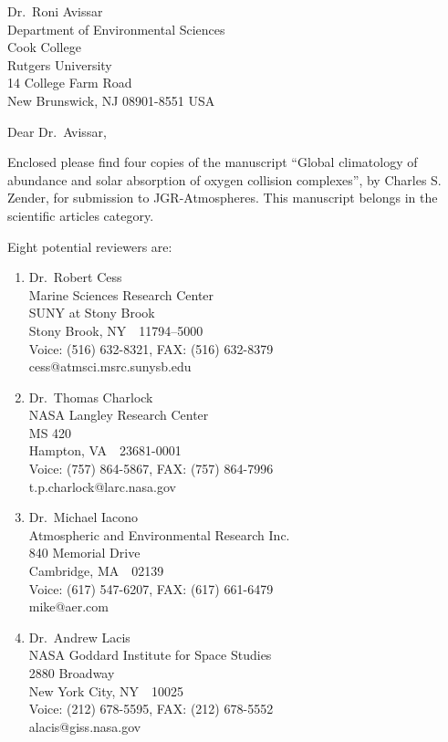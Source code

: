 \documentclass[12pt,twoside]{ncarletter}
\date{January~14, 1999} %
\begin{document}
\begin{letter}{%
Dr.~Roni Avissar\\
Department of Environmental Sciences\\
Cook College\\
Rutgers University\\
14 College Farm Road\\
New Brunswick, NJ 08901-8551 USA}

\opening{Dear Dr.~Avissar,}
\enlargethispage*{0.25in} 

Enclosed please find four copies of the manuscript ``Global
climatology of abundance and solar absorption of oxygen collision
complexes'', by Charles S. Zender, for submission to JGR-Atmospheres.   
This manuscript belongs in the scientific articles category. 

Eight potential reviewers are:
\begin{enumerate}
\item Dr.~Robert Cess\\
Marine Sciences Research Center\\
SUNY at Stony Brook\\
Stony Brook, NY~~11794--5000\\
Voice: (516) 632-8321, FAX: (516) 632-8379\\
cess@atmsci.msrc.sunysb.edu
\item Dr.~Thomas Charlock\\
NASA Langley Research Center\\
MS 420\\
Hampton, VA~~23681-0001\\
Voice: (757) 864-5867, FAX: (757) 864-7996\\
t.p.charlock@larc.nasa.gov
\item Dr.~Michael Iacono\\
Atmospheric and Environmental Research Inc.\\
840 Memorial Drive\\
Cambridge, MA~~02139\\
Voice: (617) 547-6207, FAX: (617) 661-6479\\
mike@aer.com
\item Dr.~Andrew Lacis\\
NASA Goddard Institute for Space Studies\\
2880 Broadway\\
New York City, NY~~10025\\
Voice: (212) 678-5595, FAX: (212) 678-5552\\
alacis@giss.nasa.gov
\clearpage


\end{enumerate}
\end{letter}
\end{document}
